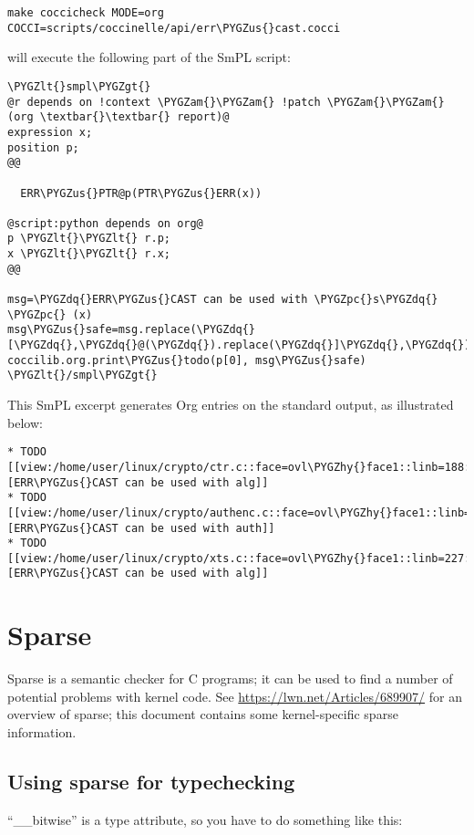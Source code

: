 \documentclass[a4paper,8pt,english]{sphinxmanual}
\def\PYGZus{\char`\_}
\def\PYGZam{\char`\&}
\def\PYGZlt{\char`\<}
\def\PYGZgt{\char`\>}
\def\PYGZpc{\char`\%}
\def\PYGZhy{\char`\-}
\def\PYGZdq{\char`\"}
\begin{document}
\begin{Verbatim}[commandchars=\\\{\}]
make coccicheck MODE=org COCCI=scripts/coccinelle/api/err\PYGZus{}cast.cocci
\end{Verbatim}

will execute the following part of the SmPL script:

\begin{Verbatim}[commandchars=\\\{\}]
\PYGZlt{}smpl\PYGZgt{}
@r depends on !context \PYGZam{}\PYGZam{} !patch \PYGZam{}\PYGZam{} (org \textbar{}\textbar{} report)@
expression x;
position p;
@@

  ERR\PYGZus{}PTR@p(PTR\PYGZus{}ERR(x))

@script:python depends on org@
p \PYGZlt{}\PYGZlt{} r.p;
x \PYGZlt{}\PYGZlt{} r.x;
@@

msg=\PYGZdq{}ERR\PYGZus{}CAST can be used with \PYGZpc{}s\PYGZdq{} \PYGZpc{} (x)
msg\PYGZus{}safe=msg.replace(\PYGZdq{}[\PYGZdq{},\PYGZdq{}@(\PYGZdq{}).replace(\PYGZdq{}]\PYGZdq{},\PYGZdq{})\PYGZdq{})
coccilib.org.print\PYGZus{}todo(p[0], msg\PYGZus{}safe)
\PYGZlt{}/smpl\PYGZgt{}
\end{Verbatim}

This SmPL excerpt generates Org entries on the standard output, as
illustrated below:

\begin{Verbatim}[commandchars=\\\{\}]
* TODO [[view:/home/user/linux/crypto/ctr.c::face=ovl\PYGZhy{}face1::linb=188::colb=9::cole=16][ERR\PYGZus{}CAST can be used with alg]]
* TODO [[view:/home/user/linux/crypto/authenc.c::face=ovl\PYGZhy{}face1::linb=619::colb=9::cole=16][ERR\PYGZus{}CAST can be used with auth]]
* TODO [[view:/home/user/linux/crypto/xts.c::face=ovl\PYGZhy{}face1::linb=227::colb=9::cole=16][ERR\PYGZus{}CAST can be used with alg]]
\end{Verbatim}


\chapter{Sparse}
\label{dev-tools/sparse:sparse}\label{dev-tools/sparse::doc}
Sparse is a semantic checker for C programs; it can be used to find a
number of potential problems with kernel code.  See
\url{https://lwn.net/Articles/689907/} for an overview of sparse; this document
contains some kernel-specific sparse information.


\section{Using sparse for typechecking}
\label{dev-tools/sparse:using-sparse-for-typechecking}
``\_\_bitwise'' is a type attribute, so you have to do something like this:
\end{document}

